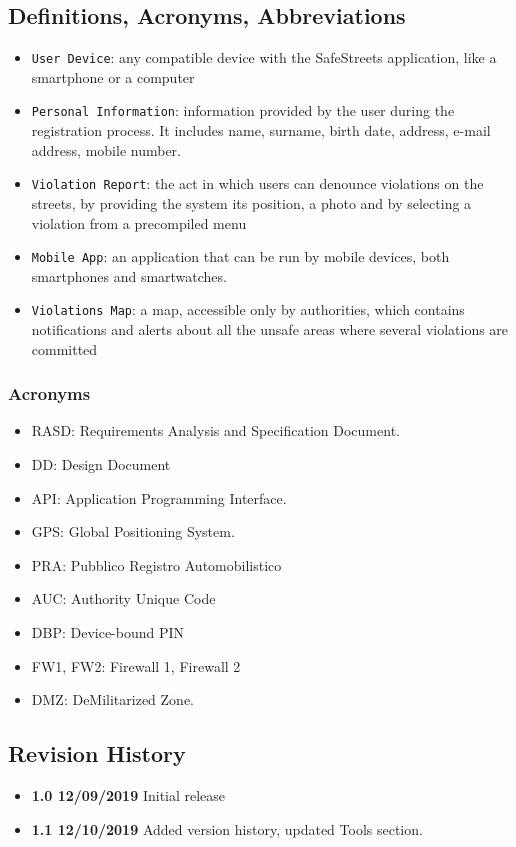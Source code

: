 \documentclass[12pt,a4paper]{article}
\begin{document}
\subsection{Definitions, Acronyms, Abbreviations}
			\begin{itemize}
				\item \texttt{User Device}: any compatible device with the SafeStreets application, like a smartphone or a computer
				\item \texttt{Personal Information}: information provided by the user during the registration process. It includes name, surname, birth date, address, e-mail address, mobile number.
				\item \texttt{Violation Report}: the act in which users can denounce violations on the streets, by providing the system its position, a photo and by selecting a violation from a precompiled menu
				\item \texttt{Mobile App}: an application that can be run by mobile devices, both smartphones and smartwatches.
				\item \texttt{Violations Map}: a map, accessible only by authorities, which contains notifications and alerts about all the unsafe areas where several violations are committed
			\end{itemize}
		\subsubsection{Acronyms}
			\begin{itemize}
				\item RASD: Requirements Analysis and Specification Document.
				\item DD: Design Document
				\item API: Application Programming Interface.
				\item GPS: Global Positioning System.
				\item PRA: Pubblico Registro Automobilistico
				\item AUC: Authority Unique Code
				\item DBP: Device-bound PIN
				\item FW1, FW2: Firewall 1, Firewall 2
				\item DMZ: DeMilitarized Zone.
			\end{itemize}
\subsection{Revision History}
\begin{itemize}
	\item \textbf{1.0 12/09/2019} Initial release
	\item \textbf{1.1 12/10/2019} Added version history, updated Tools section.
\end{itemize}
\end{document}
